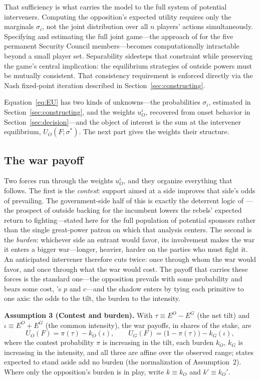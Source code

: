 That sufficiency is what carries the model to the full system of potential
interveners.  Computing the opposition's expected utility requires only the
marginals $\sigma_i$, not the joint distribution over all $n$ players'
actions simultaneously.  Specifying and estimating the full joint game---the
approach of \citet{gibilisco2022} for the five permanent Security Council
members---becomes computationally intractable beyond a small player set.
Separability sidesteps that constraint while preserving the game's central
implication: the equilibrium strategies of outside powers must be mutually
consistent.  That consistency requirement is enforced directly via the Nash
fixed-point iteration described in Section~\ref{sec:constructing}.

Equation~\eqref{eq:EU} has two kinds of unknowns---the probabilities
$\sigma_i$, estimated in Section~\ref{sec:constructing}, and the weights
$u_O^i$, recovered from onset behavior in Section~\ref{sec:decision}---and
the object of interest is the sum at the intervener equilibrium,
$U_O(F; \sigma^*)$.  The next part gives the weights their structure.

\subsection{The war payoff}
\label{app:payoff}

Two forces run through the weights $u_O^i$, and they organize everything that
follows.  The first is the \emph{contest}: support aimed at a side improves
that side's odds of prevailing.  The government-side half of this is exactly
the deterrent logic of \citet{cunningham2016}---the prospect of outside
backing for the incumbent lowers the rebels' expected return to
fighting---stated here for the full population of potential sponsors rather
than the single great-power patron on which that analysis centers.  The
second is the \emph{burden}: whichever side an entrant would favor, its
involvement makes the war it enters a bigger war---longer, heavier, harder on
the parties who must fight it.  An anticipated intervener therefore cuts
twice: once through whom the war would favor, and once through what the war
would cost.  The payoff that carries these forces is the standard one---the
opposition prevails with some probability and bears some cost,
\citeauthor{fearon1995}'s $p$ and $c$---and the shadow enters by tying each
primitive to one axis: the odds to the tilt, the burden to the intensity.

\textbf{Assumption 3 (Contest and burden).}  With $\tau \equiv E^O - E^G$
(the net tilt) and $\iota \equiv E^O + E^G$ (the common intensity), the war
payoffs, in shares of the stake, are
\[
  U_O(F) = \pi(\tau) - k_O(\iota), \qquad
  U_G(F) = \bigl(1 - \pi(\tau)\bigr) - k_G(\iota),
\]
where the contest probability $\pi$ is increasing in the tilt, each burden
$k_O$, $k_G$ is increasing in the intensity, and all three are affine over
the observed range; states expected to stand aside add no burden (the
normalization of Assumption~2).  Where only the opposition's burden is in
play, write $k \equiv k_O$ and $k' \equiv k_O'$.

